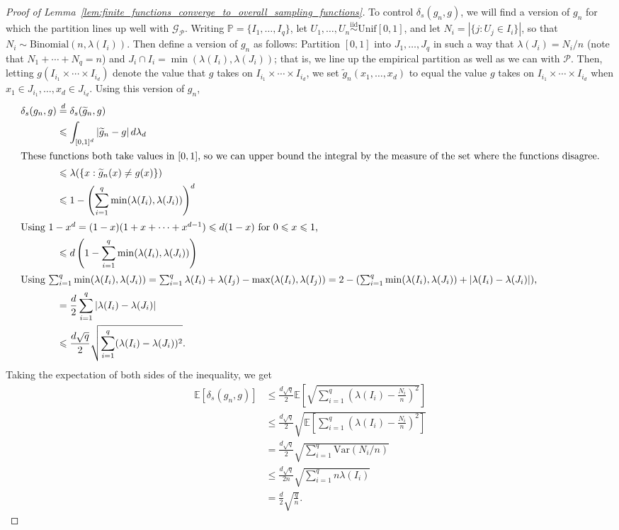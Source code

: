 \documentclass[11pt,oneside,reqno]{article}
\theoremstyle{plain}
\theoremstyle{definition}
\numberwithin{equation}{section}
\renewcommand{\leq}{\leqslant}
\newcommand{\E}{\mathbb{E}}
\begin{document}
\begin{proof}[Proof of Lemma~\ref{lem:finite_functions_converge_to_overall_sampling_functions}]
    To control $\delta_s(g_n,g)$, we will find a version of $g_n$ for which the partition lines up well with $\mathcal G_{\mathcal P}$. Writing $\mathbb P = \{I_1,\dots, I_q \}$, let $U_1,\dots,U_n \overset{\operatorname{iid}}{\sim} \text{Unif}[0,1]$, and let $N_i = | \{ j : U_j \in I_i\}|$, so that $N_i \sim \text{Binomial}(n,\lambda(I_i))$. Then define a version of $g_n$ as follows: Partition $[0,1]$ into $J_1,\dots,J_q$ in such a way that $\lambda(J_i) = N_i/n$ (note that $N_1 + \cdots + N_q = n$) and $J_i \cap I_i = \min(\lambda(I_i),\lambda(J_i))$; that is, we line up the empirical partition as well as we can with $\mathcal P$. Then, letting $g(I_{i_1} \times \cdots \times I_{i_d})$ denote the value that $g$ takes on $I_{i_1} \times \cdots \times I_{i_d}$, we set $\widetilde g_n(x_1,\dots,x_d)$ to equal the value $g$ takes on $I_{i_1} \times \cdots \times I_{i_d}$ when $x_1 \in J_{i_1},\dots,x_d \in J_{i_d}$. 
    Using this version of $g_n$,
    \begin{align*}
        \delta_s(g_n,g) &\overset{d}{=} \delta_s(\widetilde g_n,g) \\
        &\leq \int_{[0,1]^d} |\widetilde g_n-g| \, d\lambda_d \\
        \intertext{These functions both take values in $[0,1]$, so we can upper bound the integral by the measure of the set where the functions disagree.}
        &\leq \lambda(\{ x : \widetilde g_n(x) \neq g(x) \}) \\
        &\leq 1 - \left( \sum_{i=1}^q \min( \lambda(I_i),\lambda(J_i)) \right)^d \\
        \intertext{Using $1-x^d = (1-x)(1 + x + \cdots +x^{d-1}) \leq d(1-x)$ for $0 \leq x \leq 1$,}
        &\leq d \left( 1 - \sum_{i=1}^q \min( \lambda(I_i),\lambda(J_i)) \right) \\
        \intertext{Using $\sum_{i=1}^q \min( \lambda(I_i),\lambda(J_i)) = \sum_{i=1}^q \lambda(I_i) + \lambda(I_j) - \max(\lambda(I_i),\lambda(I_j)) = 2 - (\sum_{i=1}^q \min( \lambda(I_i),\lambda(J_i)) + | \lambda(I_i) - \lambda(J_i)|)$,}
        &= \frac{d}{2} \sum_{i=1}^q \left| \lambda(I_i) - \lambda(J_i) \right| \\
        &\leq \frac{d\sqrt q}{2} \sqrt{\sum_{i=1}^q (\lambda(I_i) - \lambda(J_i))^2}.
    \end{align*}
    Taking the expectation of both sides of the inequality, we get
    \begin{align*}
        \E[\delta_s(g_n,g)] &\leq \frac{d \sqrt q}{2} \E \left[ \sqrt{\sum_{i=1}^q \left(\lambda(I_i) - \frac{N_i}{n}\right)^2} \right] \\
        &\leq \frac{d \sqrt q}{2} \sqrt{\E \left[ \sum_{i=1}^q \left(\lambda(I_i) - \frac{N_i}{n}\right)^2 \right]} \\
        &= \frac{d \sqrt q}{2} \sqrt{\sum_{i=1}^q \text{Var}(N_i/n)} \\
        &\leq \frac{d \sqrt q}{2 n} \sqrt{\sum_{i=1}^q n \lambda(I_i)} \\
        &= \frac{d}{2} \sqrt{\frac{q}{n}}.
    \end{align*}


\end{proof}
\end{document}
